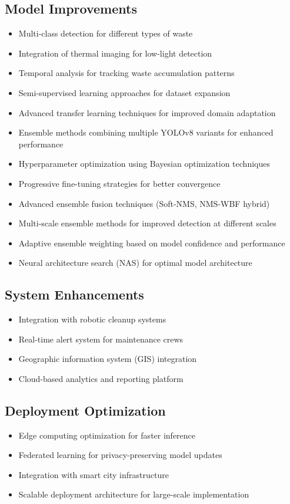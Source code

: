 \documentclass[12pt,a4paper]{article}
\begin{document}
\subsection{Model Improvements}
\begin{itemize}
    \item Multi-class detection for different types of waste
    \item Integration of thermal imaging for low-light detection
    \item Temporal analysis for tracking waste accumulation patterns
    \item Semi-supervised learning approaches for dataset expansion
    \item Advanced transfer learning techniques for improved domain adaptation
    \item Ensemble methods combining multiple YOLOv8 variants for enhanced performance
    \item Hyperparameter optimization using Bayesian optimization techniques
    \item Progressive fine-tuning strategies for better convergence
    \item Advanced ensemble fusion techniques (Soft-NMS, NMS-WBF hybrid)
    \item Multi-scale ensemble methods for improved detection at different scales
    \item Adaptive ensemble weighting based on model confidence and performance
    \item Neural architecture search (NAS) for optimal model architecture
\end{itemize}

\subsection{System Enhancements}
\begin{itemize}
    \item Integration with robotic cleanup systems
    \item Real-time alert system for maintenance crews
    \item Geographic information system (GIS) integration
    \item Cloud-based analytics and reporting platform
\end{itemize}

\subsection{Deployment Optimization}
\begin{itemize}
    \item Edge computing optimization for faster inference
    \item Federated learning for privacy-preserving model updates
    \item Integration with smart city infrastructure
    \item Scalable deployment architecture for large-scale implementation
\end{itemize}
\end{document}
